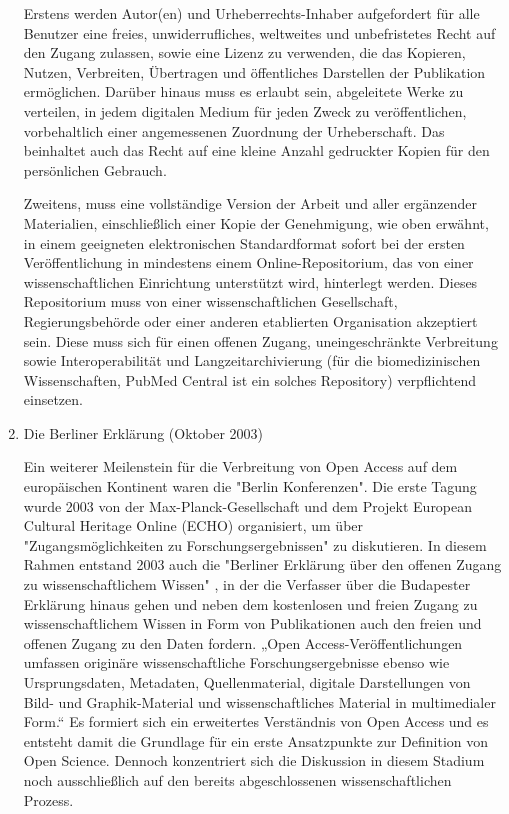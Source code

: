 \begin{enumerate}
Erstens werden Autor(en) und Urheberrechts-Inhaber aufgefordert für alle Benutzer eine freies, unwiderrufliches, weltweites und unbefristetes Recht auf den Zugang zulassen, sowie eine Lizenz zu verwenden, die das Kopieren, Nutzen, Verbreiten, Übertragen und öffentliches Darstellen der Publikation ermöglichen. Darüber hinaus muss es erlaubt sein, abgeleitete Werke zu verteilen, in jedem digitalen Medium für jeden Zweck zu veröffentlichen, vorbehaltlich einer angemessenen Zuordnung der Urheberschaft. Das beinhaltet auch das Recht auf eine kleine Anzahl gedruckter Kopien für den persönlichen Gebrauch. 

Zweitens, muss eine vollständige Version der Arbeit und aller ergänzender Materialien, einschließlich einer Kopie der Genehmigung, wie oben erwähnt, in einem geeigneten elektronischen Standardformat sofort bei der ersten Veröffentlichung in mindestens einem Online-Repositorium, das von einer wissenschaftlichen Einrichtung unterstützt wird, hinterlegt werden. Dieses Repositorium muss von einer wissenschaftlichen Gesellschaft, Regierungsbehörde oder einer anderen etablierten Organisation akzeptiert sein. Diese muss sich für einen offenen Zugang, uneingeschränkte Verbreitung sowie Interoperabilität und Langzeitarchivierung (für die biomedizinischen Wissenschaften, PubMed Central ist ein solches Repository) verpflichtend einsetzen.

\item Die Berliner Erklärung (Oktober 2003)

Ein weiterer Meilenstein für die Verbreitung von Open Access auf dem europäischen Kontinent waren die "Berlin Konferenzen"\cite{CREATe_2014}. Die erste Tagung wurde 2003 von der Max-Planck-Gesellschaft und dem Projekt European Cultural Heritage Online (ECHO) organisiert, um über "Zugangsmöglichkeiten zu Forschungsergebnissen" zu diskutieren. In diesem Rahmen entstand 2003 auch die "Berliner Erklärung über den offenen Zugang zu wissenschaftlichem Wissen" \cite{berliner_erklaerung_2003}, in der die Verfasser über die Budapester Erklärung hinaus gehen und neben dem kostenlosen und freien Zugang zu wissenschaftlichem Wissen in Form von Publikationen auch den freien und offenen Zugang zu den Daten fordern. „Open Access-Veröffentlichungen umfassen originäre wissenschaftliche Forschungsergebnisse ebenso wie Ursprungsdaten, Metadaten, Quellenmaterial, digitale Darstellungen von Bild- und Graphik-Material und wissenschaftliches Material in multimedialer Form.“ \cite{berliner_erklaerung_2003} Es formiert sich ein erweitertes Verständnis von Open Access und es entsteht damit die Grundlage für ein erste Ansatzpunkte zur Definition von Open Science. Dennoch konzentriert sich die Diskussion in diesem Stadium noch ausschließlich auf den bereits abgeschlossenen wissenschaftlichen Prozess.

\end{enumerate}


